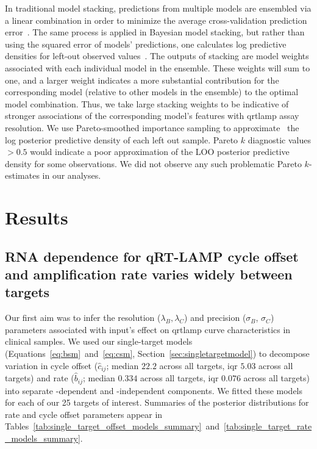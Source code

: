 \documentclass[../thesis.tex]{subfiles}
\begin{document}
In traditional model stacking, predictions from multiple models are ensembled via a linear combination in order to minimize the average cross-validation prediction error~\citep{wolpert_stacked_1992}. The same process is applied in Bayesian model stacking, but rather than using the squared error of models' predictions, one calculates log predictive densities for left-out observed values~\citep{yao_using_2018}. The outputs of stacking are model weights associated with each individual model in the ensemble. These weights will sum to one, and a larger weight indicates a more substantial contribution for the corresponding model (relative to other models in the ensemble) to the optimal model combination. Thus, we take large stacking weights to be indicative of stronger associations of the corresponding model's features with \gls{qrtlamp} assay resolution. We use Pareto-smoothed importance sampling to approximate~\citep{vehtari_practical_2017, vehtari_pareto_2021} the log posterior predictive density of each left out sample. Pareto $k$ diagnostic values $>0.5$ would indicate a poor approximation of the LOO posterior predictive density for some observations. We did not observe any such problematic Pareto $k$-estimates in our analyses.

\section{Results \label{sec:results}}

\subsection{RNA dependence for qRT-LAMP cycle offset and amplification rate varies widely between targets\label{sec:sensitivityprecision}}
Our first aim was to infer the resolution ($\lambda_B, \lambda_C$) and precision ($\sigma_{B}$, $\sigma_{C}$) parameters associated with  input's effect on \gls{qrtlamp} curve characteristics in clinical samples. We used our single-target models (Equations~\ref{eq:bsm}~and~\ref{eq:csm}, Section~\ref{sec:singletargetmodel}) to decompose variation in cycle offset ($\hat{c}_{ij}$; median $22.2$ across all targets, \gls{iqr} $5.03$ across all targets) and rate ($\hat{b}_{ij}$; median $0.334$ across all targets, \gls{iqr} $0.076$ across all targets) into separate -dependent and -independent components. We fitted these models for each of our 25 targets of interest. Summaries of the posterior distributions for rate and cycle offset parameters appear in Tables~\ref{tab:single_target_offset_models_summary}~and~\ref{tab:single_target_rate_models_summary}. 
\end{document}
